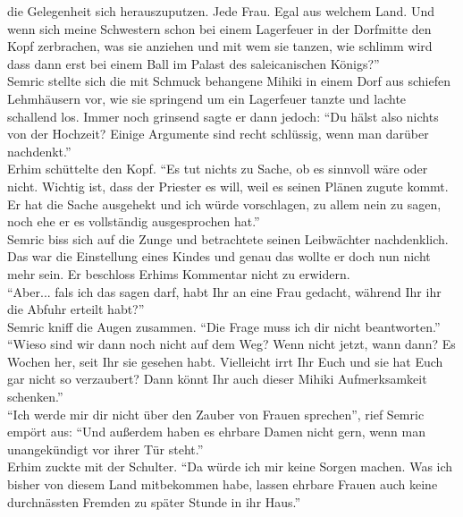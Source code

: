 die Gelegenheit sich herauszuputzen. Jede Frau. Egal aus welchem Land. Und wenn sich meine 
Schwestern schon bei einem Lagerfeuer in der Dorfmitte den Kopf zerbrachen, was sie anziehen und 
mit wem sie tanzen, wie schlimm wird dass dann erst bei einem Ball im Palast des saleicanischen 
Königs?''\\
Semric stellte sich die mit Schmuck behangene Mihiki in einem Dorf aus schiefen Lehmhäusern vor, 
wie sie springend um ein Lagerfeuer tanzte und lachte schallend los. Immer noch grinsend sagte er 
dann jedoch: ``Du hälst also nichts von der Hochzeit? Einige Argumente sind recht schlüssig, wenn 
man darüber nachdenkt.''\\
Erhim schüttelte den Kopf. ``Es tut nichts zu Sache, ob es sinnvoll wäre oder nicht. Wichtig ist, 
dass der Priester es will, weil es seinen Plänen zugute kommt. Er hat die Sache ausgehekt und ich 
würde vorschlagen, zu allem nein zu sagen, noch ehe er es vollständig ausgesprochen hat.''\\
Semric biss sich auf die Zunge und betrachtete seinen Leibwächter nachdenklich. Das war die 
Einstellung eines Kindes und genau das wollte er doch nun nicht mehr sein. Er beschloss Erhims 
Kommentar nicht zu erwidern.\\
``Aber... fals ich das sagen darf, habt Ihr an eine Frau gedacht, während Ihr ihr die Abfuhr 
erteilt habt?''\\
Semric kniff die Augen zusammen. ``Die Frage muss ich dir nicht beantworten.''\\
``Wieso sind wir dann noch nicht auf dem Weg? Wenn nicht jetzt, wann dann? Es Wochen her, seit 
Ihr sie gesehen habt. Vielleicht irrt Ihr Euch und sie hat Euch gar nicht so verzaubert? Dann könnt 
Ihr auch dieser Mihiki Aufmerksamkeit schenken.''\\
``Ich werde mir dir nicht über den Zauber von Frauen sprechen'', rief Semric empört aus: ``Und 
außerdem haben es ehrbare Damen nicht gern, wenn man unangekündigt vor ihrer Tür steht.''\\
Erhim zuckte mit der Schulter. ``Da würde ich mir keine Sorgen machen. Was ich bisher  von diesem 
Land mitbekommen habe, lassen ehrbare Frauen auch keine durchnässten Fremden zu später Stunde in 
ihr Haus.''\\

